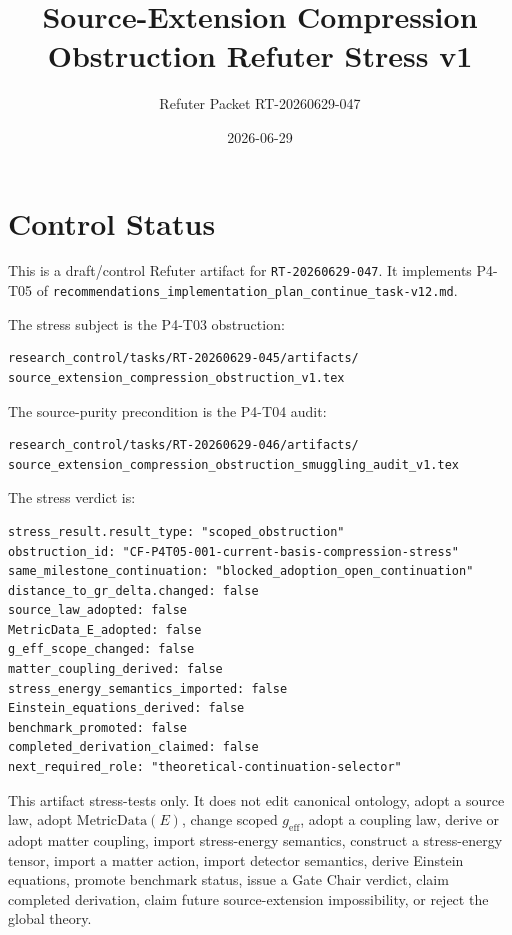 \documentclass[11pt]{article}
\title{Source-Extension Compression Obstruction Refuter Stress v1}
\author{Refuter Packet RT-20260629-047}
\date{2026-06-29}
\newcommand{\MetricData}{\mathrm{MetricData}}
\newcommand{\geff}{g_{\mathrm{eff}}}
\begin{document}
\maketitle

\section{Control Status}

This is a draft/control Refuter artifact for \texttt{RT-20260629-047}. It
implements P4-T05 of
\texttt{recommendations\_implementation\_plan\_continue\_task-v12.md}.

The stress subject is the P4-T03 obstruction:

\begin{verbatim}
research_control/tasks/RT-20260629-045/artifacts/
source_extension_compression_obstruction_v1.tex
\end{verbatim}

The source-purity precondition is the P4-T04 audit:

\begin{verbatim}
research_control/tasks/RT-20260629-046/artifacts/
source_extension_compression_obstruction_smuggling_audit_v1.tex
\end{verbatim}

The stress verdict is:

\begin{verbatim}
stress_result.result_type: "scoped_obstruction"
obstruction_id: "CF-P4T05-001-current-basis-compression-stress"
same_milestone_continuation: "blocked_adoption_open_continuation"
distance_to_gr_delta.changed: false
source_law_adopted: false
MetricData_E_adopted: false
g_eff_scope_changed: false
matter_coupling_derived: false
stress_energy_semantics_imported: false
Einstein_equations_derived: false
benchmark_promoted: false
completed_derivation_claimed: false
next_required_role: "theoretical-continuation-selector"
\end{verbatim}

This artifact stress-tests only. It does not edit canonical ontology, adopt a
source law, adopt \(\MetricData(E)\), change scoped \(\geff\), adopt a
coupling law, derive or adopt matter coupling, import stress-energy semantics,
construct a stress-energy tensor, import a matter action, import detector
semantics, derive Einstein equations, promote benchmark status, issue a Gate
Chair verdict, claim completed derivation, claim future source-extension
impossibility, or reject the global theory.
\end{document}
